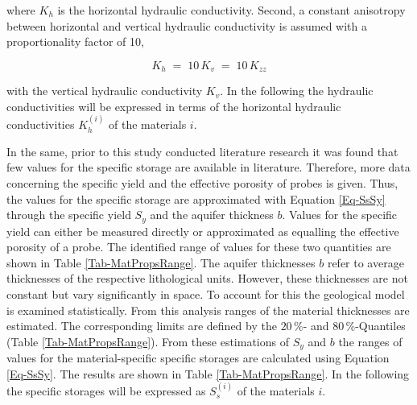 \noindent where $K_h$ is the horizontal hydraulic conductivity. 
Second, a constant anisotropy between horizontal and vertical hydraulic conductivity is assumed with a proportionality factor of 10,

\begin{equation}
    K_h \; = \; 10 \, K_v \; = \; 10 \, K_{zz}
\end{equation}

\noindent with the vertical hydraulic conductivity $K_v$. 
In the following the hydraulic conductivities will be expressed in terms of the horizontal hydraulic conductivities $K_{h}^{(i)}$ of the materials $i$.


In the same, prior to this study conducted literature research it was found that few values for the specific storage are available in literature. 
Therefore, more data concerning the specific yield and the effective porosity of probes is given. 
Thus, the values for the specific storage are approximated with Equation \eqref{Eq-SsSy} through the specific yield $S_y$ and the aquifer thickness $b$. 
Values for the specific yield can either be measured directly or approximated as equalling the effective porosity of a probe. 
The identified range of values for these two quantities are shown in Table \ref{Tab-MatPropsRange}. 
The aquifer thicknesses $b$ refer to average thicknesses of the respective lithological units. 
However, these thicknesses are not constant but vary significantly in space. 
To account for this the geological model is examined statistically. 
From this analysis ranges of the material thicknesses are estimated. 
The corresponding limits are defined by the $20 \, \%$- and $80 \, \%$-Quantiles (Table \ref{Tab-MatPropsRange}). 
From these estimations of $S_y$ and $b$ the ranges of values for the material-specific specific storages are calculated using Equation \eqref{Eq-SsSy}. 
The results are shown in Table \ref{Tab-MatPropsRange}. 
In the following the specific storages will be expressed as $S_{s}^{(i)}$ of the materials $i$. 

